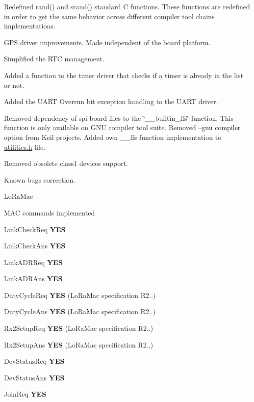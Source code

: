 \begin{DoxyItemize}
\begin{DoxyEnumerate}
\begin{DoxyItemize}
\end{DoxyItemize}
\item Redefined rand() and srand() standard C functions. These functions are redefined in order to get the same behavior across different compiler tool chains implementations.
\item G\+PS driver improvements. Made independent of the board platform.
\item Simplified the R\+TC management.
\item Added a function to the timer driver that checks if a timer is already in the list or not.
\item Added the U\+A\+RT Overrun bit exception handling to the U\+A\+RT driver.
\item Removed dependency of spi-\/board files to the \char`\"{}\+\_\+\+\_\+builtin\+\_\+ffs\char`\"{} function. This function is only available on G\+NU compiler tool suite. Removed --gnu compiler option from Keil projects. Added own \+\_\+\+\_\+ffs function implementation to \mbox{\hyperlink{utilities_8h}{utilities.\+h}} file.
\item Removed obsolete class1 devices support.
\item Known bugs correction.
\end{DoxyEnumerate}
\item Lo\+Ra\+Mac
\begin{DoxyEnumerate}
\item M\+AC commands implemented
\begin{DoxyItemize}
\item Link\+Check\+Req {\bfseries Y\+ES}
\item Link\+Check\+Ans {\bfseries Y\+ES}
\item Link\+A\+D\+R\+Req {\bfseries Y\+ES}
\item Link\+A\+D\+R\+Ans {\bfseries Y\+ES}
\item Duty\+Cycle\+Req {\bfseries Y\+ES} (Lo\+Ra\+Mac specification R2..)
\item Duty\+Cycle\+Ans {\bfseries Y\+ES} (Lo\+Ra\+Mac specification R2..)
\item Rx2\+Setup\+Req {\bfseries Y\+ES} (Lo\+Ra\+Mac specification R2..)
\item Rx2\+Setup\+Ans {\bfseries Y\+ES} (Lo\+Ra\+Mac specification R2..)
\item Dev\+Status\+Req {\bfseries Y\+ES}
\item Dev\+Status\+Ans {\bfseries Y\+ES}
\item Join\+Req {\bfseries Y\+ES}

\end{DoxyItemize}
\end{DoxyEnumerate}
\end{DoxyItemize}
